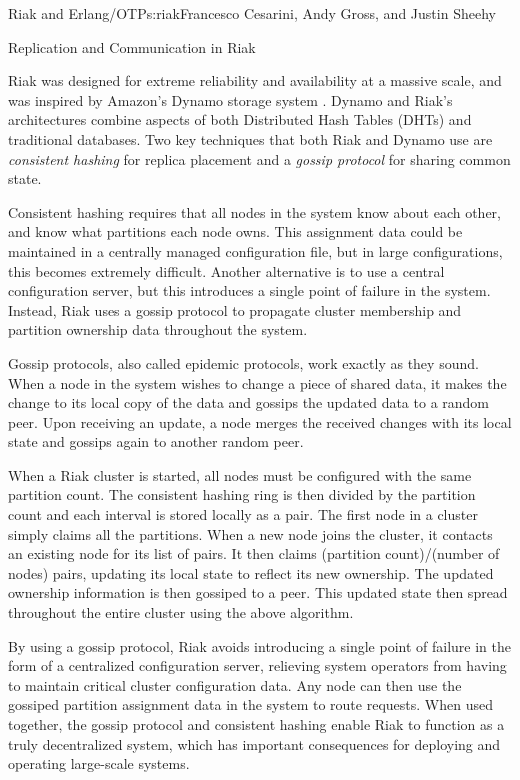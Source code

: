\begin{aosachapter}{Riak and Erlang/OTP}{s:riak}{Francesco Cesarini, Andy Gross, and Justin Sheehy}
\begin{aosasect1}{Replication and Communication in Riak}

Riak was designed for extreme reliability and availability at a
massive scale, and was inspired by Amazon's Dynamo storage system
\cite{bib:amazon:dynamo}.  Dynamo and Riak's architectures combine
aspects of both Distributed Hash Tables (DHTs) and traditional
databases.  Two key techniques that both Riak and Dynamo use are
\emph{consistent hashing} for replica placement and a \emph{gossip
protocol} for sharing common state.

Consistent hashing requires that all nodes in the system know about
each other, and know what partitions each node owns.  This assignment
data could be maintained in a centrally managed configuration file,
but in large configurations, this becomes extremely difficult. Another
alternative is to use a central configuration server, but this
introduces a single point of failure in the system. Instead, Riak uses
a gossip protocol to propagate cluster membership and partition
ownership data throughout the system.

Gossip protocols, also called epidemic protocols, work exactly as they
sound.  When a node in the system wishes to change a piece of shared
data, it makes the change to its local copy of the data and gossips
the updated data to a random peer.  Upon receiving an update, a node
merges the received changes with its local state and gossips again to
another random peer.

When a Riak cluster is started, all nodes must be configured with the
same partition count. The consistent hashing ring is then divided by
the partition count and each interval is stored locally as a
 pair. The first node in a cluster simply
claims all the partitions.  When a new node joins the cluster, it
contacts an existing node for its list of 
pairs.  It then claims (partition count)/(number of nodes) pairs,
updating its local state to reflect its new ownership. The updated
ownership information is then gossiped to a peer. This updated state
then spread throughout the entire cluster using the above algorithm.

By using a gossip protocol, Riak avoids introducing a single point of
failure in the form of a centralized configuration server, relieving
system operators from having to maintain critical cluster
configuration data.  Any node can then use the gossiped partition
assignment data in the system to route requests.  When used together,
the gossip protocol and consistent hashing enable Riak to function as
a truly decentralized system, which has important consequences for
deploying and operating large-scale systems.


\end{aosasect1}
\end{aosachapter}
